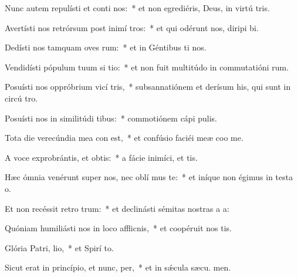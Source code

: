 \item Nunc autem repulísti et conti nos:~* et non egrediéris, Deus, in virtú tris.
\item Avertísti nos retrórsum post inimí tros:~* et qui odérunt nos, diripi bi.
\item Dedísti nos tamquam oves rum:~* et in Géntibus ti nos.
\item Vendidísti pópulum tuum si tio:~* et non fuit multitúdo in commutatióni rum.
\item Posuísti nos oppróbrium vicí tris,~* subsannatiónem et derísum his, qui sunt in circú tro.
\item Posuísti nos in similitúdi tibus:~* commotiónem cápi  pulis.
\item Tota die verecúndia mea con  est,~* et confúsio faciéi meæ coo me.
\item A voce exprobrántis, et obtis:~* a fácie inimíci, et tis.
\item Hæc ómnia venérunt super nos, nec oblí mus te:~* et iníque non égimus in testa o.
\item Et non recéssit retro  trum:~* et declinásti sémitas nostras a  a:
\item Quóniam humiliásti nos in loco afflicnis,~* et coopéruit nos  tis.
\item Glória Patri,  lio,~* et Spirí to.
\item Sicut erat in princípio, et nunc,  per,~* et in sǽcula sæcu. men.
